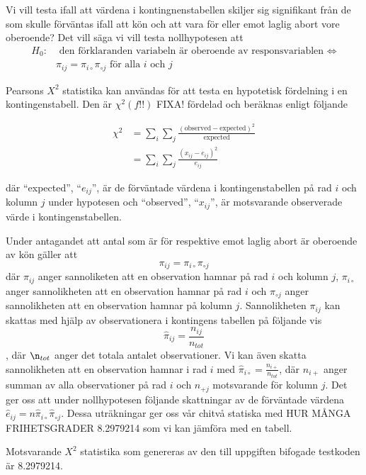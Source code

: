 \documentclass[]{article}
\begin{document}
Vi vill testa ifall att värdena i kontingnenstabellen skiljer sig
signifikant från de som skulle förväntas ifall att kön och att vara för
eller emot laglig abort vore oberoende? Det vill säga vi vill testa
nollhypotesen att \[
\begin{aligned}
H_{0}: & \text{ den förklaranden variabeln är oberoende av responsvariablen } \Leftrightarrow \\
       &\pi_{ij} = \pi_{i\circ}\pi_{\circ j} \text{ för alla $i$ och $j$}
\end{aligned}
\]

Pearsons \(X^{2}\) statistika kan användas för att testa en hypotetisk
fördelning i en kontingenstabell. Den är \(\chi^{2}(f!!)\) FIXA!
fördelad och beräknas enligt följande

\[
\begin{aligned}
\chi^{2} &= \sum_{i} \sum_{j}  \frac{(\text{observed} - \text{expected})^{2}}{\text{expected}}\\
         &= \sum_{i} \sum_{j}  \frac{(x_{ij} - e_{ij})^{2}}{e_{ij}}
\end{aligned}
\]

där ``expected'', ``\(e_{ij}\)'', är de förväntade värdena i
kontingenstabellen på rad \(i\) och kolumn \(j\) under hypotesen och
``observed'', ``\(x_{ij}\)'', är motsvarande observerade värde i
kontingenstabellen.

Under antagandet att antal som är för respektive emot laglig abort är
oberoende av kön gäller att \[
\pi_{ij} = \pi_{i\circ}\pi_{\circ j}
\] där \(\pi_{ij}\) anger sannoliketen att en observation hamnar på rad
\(i\) och kolumn \(j\), \(\pi_{i\circ}\) anger sannolikheten att en
observation hamnar på rad \(i\) och \(\pi_{\circ j}\) anger
sannolikheten att en observation hamnar på kolumn \(j\). Sannolikheten
\(\pi_{ij}\) kan skattas med hjälp av observationera i kontingens
tabellen på följande vis
\[\widehat{\pi}_{ij} = \frac{n_{ij}}{n_{tot}}\], där \(\n_{tot}\) anger
det totala antalet observationer. Vi kan även skatta sannolikheten att
en observation hamnar i rad \(i\) med
\(\widehat{\pi}_{i\circ} = \frac{n_{i+}}{n_{tot}}\), där \(n_{i+}\)
anger summan av alla observationer på rad \(i\) och \(n_{+j}\)
motsvarande för kolumn \(j\). Det ger oss att under nollhypotesen
följande skattningar av de förväntade värdena
\(\widehat{e}_{ij} = n\widehat{\pi}_{i\circ}\widehat{\pi}_{\circ j}\).
Dessa uträkningar ger oss vår chitvå statiska med HUR MÅNGA
FRIHETSGRADER 8.2979214 som vi kan jämföra med en tabell.

Motsvarande \(X^{2}\) statistika som genereras av den till uppgiften
bifogade testkoden är 8.2979214.
\end{document}
